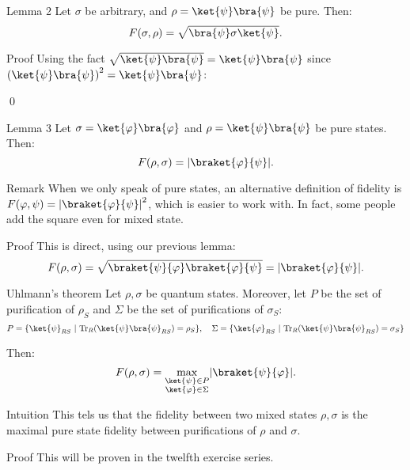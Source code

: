 \documentclass[a4paper]{article}
\begin{document}
\begin{parag}{Lemma 2}
    Let $\sigma$ be arbitrary, and $\rho = \ket{\psi}\bra{\psi}$ be pure. Then: 
    \[F\left(\sigma, \rho\right) = \sqrt{\bra{\psi} \sigma \ket{\psi}}.\]

    \begin{subparag}{Proof}
        Using the fact $\sqrt{\ket{\psi}\bra{\psi}} = \ket{\psi}\bra{\psi}$ since $\left(\ket{\psi}\bra{\psi}\right)^2 = \ket{\psi}\bra{\psi}$: 

        \qed
    \end{subparag}
\end{parag}

\begin{parag}{Lemma 3}
    Let $\sigma = \ket{\phi}\bra{\phi}$ and $\rho = \ket{\psi}\bra{\psi}$ be pure states. Then: 
    \[F\left(\rho, \sigma\right) = \left|\braket{\phi}{\psi}\right|.\]

    \begin{subparag}{Remark}
        When we only speak of pure states, an alternative definition of fidelity is $F\left(\phi, \psi\right) = \left|\braket{\phi}{\psi}\right|^2$, which is easier to work with. In fact, some people add the square even for mixed state.
    \end{subparag}

    \begin{subparag}{Proof}
        This is direct, using our previous lemma:
        \[F\left(\rho, \sigma\right) = \sqrt{\braket{\psi}{\phi} \braket{\phi}{\psi}} = \left|\braket{\phi}{\psi}\right|.\]
    \end{subparag}
\end{parag}


\begin{parag}{Uhlmann's theorem}
    Let $\rho, \sigma$ be quantum states. Moreover, let $P$ be the set of purification of $\rho_S$ and $\Sigma$ be the set of purifications of $\sigma_S$:
    \[P = \left\{\ket{\psi}_{RS} \suchthat \Tr_R\left(\ket{\psi}\bra{\psi}_{RS}\right) = \rho_S\right\}, \mathspace \Sigma = \left\{\ket{\phi}_{RS} \suchthat \Tr_R\left(\ket{\psi}\bra{\psi}_{RS}\right) = \sigma_S\right\}\]

    Then:
    \[F\left(\rho, \sigma\right) = \max_{\substack{\ket{\psi} \in P \\ \ket{\phi} \in \Sigma}} \left|\braket{\psi}{\phi}\right|.\]
    
    \begin{subparag}{Intuition}
        This tels us that the fidelity between two mixed states $\rho, \sigma$ is the maximal pure state fidelity between purifications of $\rho$ and $\sigma$.
    \end{subparag}

    \begin{subparag}{Proof}
        This will be proven in the twelfth exercise series.
    \end{subparag}
\end{parag}
\end{document}
